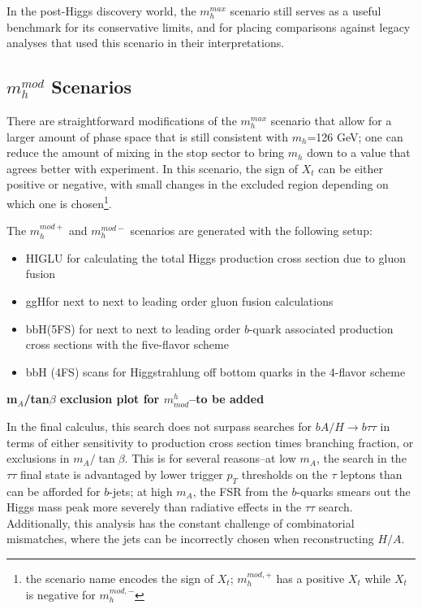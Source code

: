 In the post-Higgs discovery world, the $m_h^{max}$ scenario still serves as a useful
benchmark for its conservative limits, and for placing comparisons against legacy analyses
that used this scenario in their interpretations.   



\subsection{$m_h^{mod}$ Scenarios}
There are straightforward modifications of the $m_h^{max}$ scenario that allow for 
a larger amount of phase space that is still consistent with $m_h$=126 GeV; one
can reduce the amount of mixing in the stop sector to bring $m_h$ down to a value
that agrees better with experiment.  In this scenario, the sign of $X_t$ can be either
positive or negative, with small changes in the excluded region depending on 
which one is chosen\footnote{the scenario name encodes the sign of $X_t$; $m_h^{mod,+}$
has a positive $X_t$ while $X_t$ is negative for $m_h^{mod,-}$}.

The $m_h^{mod+}$ and $m_h^{mod-}$ scenarios are generated with the following setup:
\begin{itemize}
    \item HIGLU for calculating the total Higgs production cross section due to gluon fusion \cite{higlu}
    \item ggH\@NNLO for next to next to leading order gluon fusion calculations \cite{gghnnlo} 
    \item bbH\@NNLO (5FS) for next to next to leading order $b$-quark associated production cross sections with the five-flavor scheme \cite{bbhnnlo}
    \item bbH (4FS) scans for Higgstrahlung off bottom quarks in the 4-flavor scheme \cite{bbh_4fs_1} \cite{bbh_4fs_2}
\end{itemize}

\textbf{m$_A$/tan$\beta$ exclusion plot for $m^h_{mod}$--to be added}

In the final calculus, this search does not surpass searches for $bA/H\rightarrow b\tau\tau$
in terms of either sensitivity to production cross section times branching fraction, 
or exclusions in $m_A/\tan\beta$.  This is for several reasons--at low $m_A$, the 
search in the $\tau\tau$ final state is advantaged by lower trigger $p_T$ thresholds
on the $\tau$ leptons than can be afforded for $b$-jets; at high $m_A$, the FSR from
the $b$-quarks smears out the Higgs mass peak more severely than radiative effects 
in the $\tau\tau$ search.  Additionally, this analysis has the constant challenge of
combinatorial mismatches, where the jets can be incorrectly chosen when reconstructing $H/A$.

